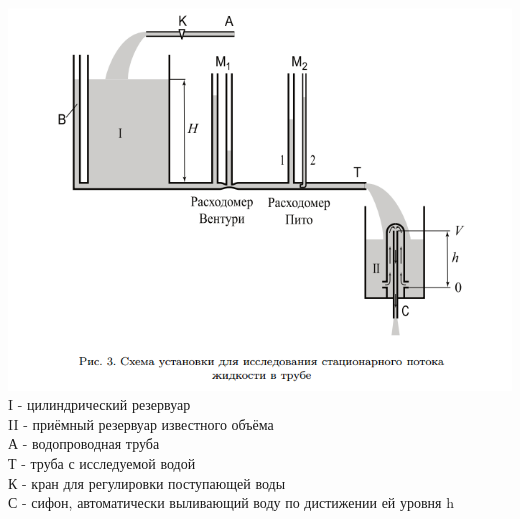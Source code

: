 \documentclass[a4paper,12pt]{article} %
\begin{document}
\includegraphics[width=\textwidth]{facility.png}
\\
I - цилиндрический резервуар\\
II - приёмный резервуар известного объёма\\
А - водопроводная труба\\
Т - труба с исследуемой водой\\
К - кран для регулировки поступающей воды\\
	\vspace{0.2cm}
С - сифон, автоматически выливающий воду по дистижении ей уровня h\\
\end{document}
